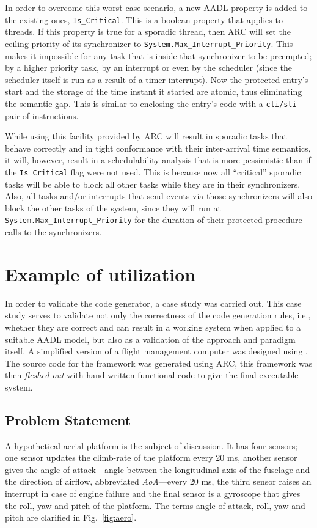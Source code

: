 In order to overcome this worst-case scenario, a new AADL property is
added to the existing ones, \texttt{Is\_Critical}. This is a boolean
property that applies to threads. If this property is true for a
sporadic thread, then ARC will set the ceiling priority of its
synchronizer to \texttt{System.Max\_Interrupt\_Priority}. This makes
it impossible for any task that is inside that synchronizer to be
preempted; by a higher priority task, by an interrupt or even by the
scheduler (since the scheduler itself is run as a result of a timer
interrupt). Now the protected entry's start and the storage of the
time instant it started are atomic, thus eliminating the semantic
gap. This is similar to enclosing the entry's code with a
\texttt{cli/sti} pair of instructions.

While using this facility provided by ARC will result in sporadic
tasks that behave correctly and in tight conformance with their
inter-arrival time semantics, it will, however, result in a
schedulability analysis that is more pessimistic than if the
\texttt{Is\_Critical} flag were not used. This is because now all
``critical'' sporadic tasks will be able to block all other tasks
while they are in their synchronizers. Also, all tasks and/or
interrupts that send events via those synchronizers will also block
the other tasks of the system, since they will run at
\texttt{System.Max\_Interrupt\_Priority} for the duration of their
protected procedure calls to the synchronizers.

\section{Example of utilization}
\label{sec:case_study}
In order to validate the code generator, a case study was carried
out. This case study serves to validate not only the correctness of
the code generation rules, i.e., whether they are correct and can
result in a working system when applied to a suitable AADL model, but
also as a validation of the approach and paradigm itself. A simplified
version of a flight management computer was designed using \aadl. The
source code for the framework was generated using ARC, this framework
was then \emph{fleshed out} with hand-written functional code to give
the final executable system.

\subsection{Problem Statement}
A hypothetical aerial platform is the subject of discussion. It has
four sensors; one sensor updates the climb-rate of the platform every
20 ms, another sensor gives the angle-of-attack---angle between the
longitudinal axis of the fuselage and the direction of airflow,
abbreviated \emph{AoA}---every 20 ms, the third sensor raises an
interrupt in case of engine failure and the final sensor is a
gyroscope that gives the roll, yaw and pitch of the platform. The
terms angle-of-attack, roll, yaw and pitch are clarified in
Fig.~\ref{fig:aero}.


